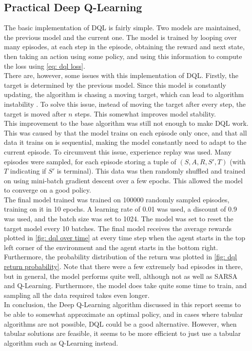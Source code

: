 \documentclass{class}
\begin{document}
\begin{appendices}
\subsection{Practical Deep Q-Learning}
The basic implementation of DQL is fairly simple. Two models are maintained, the previous model and the current one. The model is trained by looping over many episodes, at each step in the episode, obtaining the reward and next state, then taking an action using some policy, and using this information to compute the loss using \autoref{eq: dql loss}. 
\\[0.3cm]
There are, however, some issues with this implementation of DQL. Firstly, the target is determined by the previous model. Since this model is constantly updating, the algorithm is chasing a moving target, which can lead to algorithm instability \parencite{lecture6}. To solve this issue, instead of moving the target after every step, the target is moved after $n$ steps. This somewhat improves model stability.
\\[0.3cm]
This improvement to the base algorithm was still not enough to make DQL work. This was caused by that the model trains on each episode only once, and that all data it trains on is sequential, making the model constantly need to adapt to the current episode. To circumvent this issue, experience replay was used. Many episodes were sampled, for each episode storing a tuple of $(S, A, R, S', T)$ (with $T$ indicating if $S'$ is terminal). This data was then randomly shuffled and trained on using mini-batch gradient descent over a few epochs. This allowed the model to converge on a good policy.
\\[0.3cm]
The final model trained was trained on 100000 randomly sampled episodes, training on it in 10 epochs. A learning rate of 0.01 was used, a discount of 0.9 was used, and the batch size was set to 1024. The model was set to reset the target model every 10 batches. The final model receives the average rewards plotted in \autoref{fig: dql over time} at every time step when the agent starts in the top left corner of the environment and the agent starts in the bottom right. Furthermore, the probability distribution of the return was plotted in \autoref{fig: dql return probability}. Note that there were a few extremely bad episodes in there, but in general, the model performs quite well, although not as well as SARSA and Q-Learning. Furthermore, the model does take quite some time to train, and sampling all the data required takes even longer.
\\[0.3cm]
In conclusion, the Deep Q-Learning algorithm discussed in this report seems to be able to somewhat approximate an optimal policy, and in cases where tabular algorithms are not possible, DQL could be a good alternative. However, when tabular solutions are feasible, it seems to be more efficient to just use a tabular algorithm such as Q-Learning instead.


\end{appendices}
\end{document}
